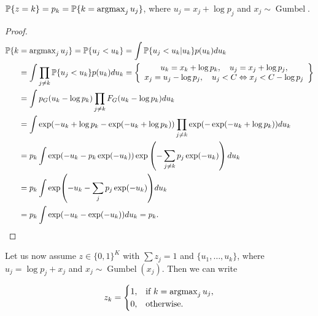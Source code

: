 \begin{etheorem}
    $\operatorname{\mathbb{P}}\{z = k\} = p_k = \operatorname{\mathbb{P}}\{k = \operatorname{argmax}_j u_j\}$, where $u_j = x_j + \log p_j$ and $x_j \sim \operatorname{Gumbel}$.
\end{etheorem}

\begin{proof}
    \begin{equation*}
        \begin{aligned}
            \operatorname{\mathbb{P}}\{k &= \operatorname{argmax}_j u_j\} = \operatorname{\mathbb{P}}\{u_j < u_k\} = \int \operatorname{\mathbb{P}} \{u_j < u_k | u_k\} p(u_k) d u_k  \\ 
            &= \int \prod_{j \neq k} \operatorname{\mathbb{P}} \{u_j < u_k\} p(u_k) d u_k = 
            \left\{
            \begin{array}{c}
                u_k = x_k + \log p_k, \quad u_j = x_j + \log p_j, \\ 
                x_j = u_j - \log p_j, \quad u_j < C \Leftrightarrow x_j < C - \log p_j
            \end{array} 
            \right\} \\ 
            &= \int p_G (u_k - \log p_k) \prod_{j \neq k} F_G (u_k - \log p_k) d u_k  \\ 
            &= \int \exp (- u_k + \log p_k - \exp (- u_k + \log p_k)) \prod_{j \neq k} \exp (- \exp (- u_k + \log p_k)) d u_k  \\ 
            &= p_k \int \exp (- u_k - p_k \exp (- u_k)) \exp \left( - \sum_{j \neq k} p_j \exp (- u_k) \right) d u_k  \\ 
            &= p_k \int \exp (- u_k - \sum_{j} p_j \exp (- u_k)) d u_k \\ 
            &= p_k \int \exp (- u_k - \exp (- u_k)) d u_k = p_k.
        \end{aligned}
    \end{equation*}
\end{proof}

Let us now assume $z \in \{0, 1\}^K$ with $\sum z_j = 1$ and $\{u_1, \ldots, u_k\}$, where $u_j = \log p_j + x_j$ and $x_j \sim \operatorname{Gumbel}(x_j)$. Then we can write

\begin{equation*}
    \begin{aligned}
        z_k = 
        \begin{cases}
            1, & \text{if } k = \operatorname{argmax}_j u_j, \\ 
            0, & \text{otherwise}.
        \end{cases}
    \end{aligned}
\end{equation*}

